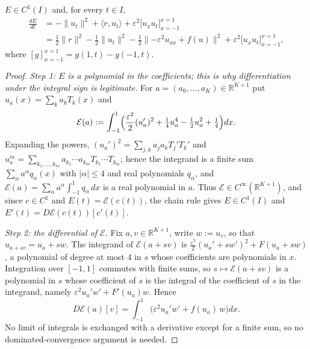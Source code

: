 \begin{Proposition}\label{prop:pde-identity}
$E\in C^1(I)$ and, for every $t\in I$,
\begin{equation}\label{eq:pde-identity}
\begin{aligned}
\frac{dE}{dt}&=-\|u_t\|^2+\langle r,u_t\rangle+\varepsilon^2\bigl[u_xu_t\bigr]_{x=-1}^{x=1}\\
&=\tfrac12\|r\|^2-\tfrac12\|u_t\|^2-\tfrac12\bigl\|{-\varepsilon^2u_{xx}}+f(u)\bigr\|^2+\varepsilon^2\bigl[u_xu_t\bigr]_{x=-1}^{x=1},
\end{aligned}
\end{equation}
where $[g]_{x=-1}^{x=1}=g(1,t)-g(-1,t)$.
\end{Proposition}
\begin{proof}
\emph{Step 1: $E$ is a polynomial in the coefficients; this is why differentiation under the integral sign is legitimate.}
For $a=(a_0,\dots,a_K)\in\mathbb{R}^{K+1}$ put $u_a(x)=\sum_ka_kT_k(x)$ and
\[
\mathcal{E}(a):=\int_{-1}^{1}\Bigl(\frac{\varepsilon^2}{2}(u_a')^2+\tfrac14u_a^4-\tfrac12u_a^2+\tfrac14\Bigr)dx .
\]
Expanding the powers, $(u_a')^2=\sum_{j,k}a_ja_kT_j'T_k'$ and $u_a^m=\sum_{k_1,\dots,k_m}a_{k_1}\cdots a_{k_m}T_{k_1}\cdots T_{k_m}$; hence the integrand is a finite sum $\sum_\alpha a^\alpha q_\alpha(x)$ with $|\alpha|\le4$ and real polynomials $q_\alpha$, and
$\mathcal{E}(a)=\sum_\alpha a^\alpha\int_{-1}^{1}q_\alpha\,dx$ is a real polynomial in $a$.
Thus $\mathcal{E}\in C^\infty(\mathbb{R}^{K+1})$, and since $c\in C^1$ and $E(t)=\mathcal{E}(c(t))$, the chain rule gives $E\in C^1(I)$ and $E'(t)=D\mathcal{E}(c(t))[c'(t)]$.

\emph{Step 2: the differential of $\mathcal{E}$.}
Fix $a,v\in\mathbb{R}^{K+1}$, write $w:=u_v$, so that $u_{a+sv}=u_a+sw$.
The integrand of $\mathcal{E}(a+sv)$ is $\frac{\varepsilon^2}{2}(u_a'+sw')^2+F(u_a+sw)$, a polynomial of degree at most $4$ in $s$ whose coefficients are polynomials in $x$.
Integration over $[-1,1]$ commutes with finite sums, so $s\mapsto\mathcal{E}(a+sv)$ is a polynomial in $s$ whose coefficient of $s$ is the integral of the coefficient of $s$ in the integrand, namely $\varepsilon^2u_a'w'+F'(u_a)w$. Hence
\begin{equation}\label{eq:DE}
D\mathcal{E}(a)[v]=\int_{-1}^{1}\bigl(\varepsilon^2u_a'w'+f(u_a)\,w\bigr)dx .
\end{equation}
No limit of integrals is exchanged with a derivative except for a finite sum, so no dominated-convergence argument is needed.


\end{proof}
